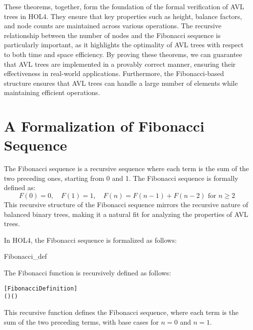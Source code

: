 These theorems, together, form the foundation of the formal verification of AVL trees in HOL4. They ensure that key properties such as height, balance factors, and node counts are maintained across various operations. The recursive relationship between the number of nodes and the Fibonacci sequence is particularly important, as it highlights the optimality of AVL trees with respect to both time and space efficiency. By proving these theorems, we can guarantee that AVL trees are implemented in a provably correct manner, ensuring their effectiveness in real-world applications. Furthermore, the Fibonacci-based structure ensures that AVL trees can handle a large number of elements while maintaining efficient operations.

\section{A Formalization of Fibonacci Sequence}

    The Fibonacci sequence is a recursive sequence where each term is the sum of the two preceding ones, starting from 0 and 1. The Fibonacci sequence is formally defined as:
    \[
    F(0) = 0, \quad F(1) = 1, \quad F(n) = F(n-1) + F(n-2) \text{ for } n \geq 2
    \]
    This recursive structure of the Fibonacci sequence mirrors the recursive nature of balanced binary trees, making it a natural fit for analyzing the properties of AVL trees.

    In HOL4, the Fibonacci sequence is formalized as follows:
   \begin{defn}{Fibonacci\_def}

    The Fibonacci function is recursively defined as follows:

     \begin{alltt}
[Fibonacci Definition]
  \HOLTokenDefEquality{}
    \HOLSymConst{=}   
     \HOLSymConst{=}   
    ( \HOLSymConst{\ensuremath{-}} ) \HOLSymConst{\ensuremath{+}}  ( \HOLSymConst{\ensuremath{-}} )
     \end{alltt}
     

    This recursive function defines the Fibonacci sequence, where each term is the sum of the two preceding terms, with base cases for \( n = 0 \) and \( n = 1 \).
    \end{defn}


